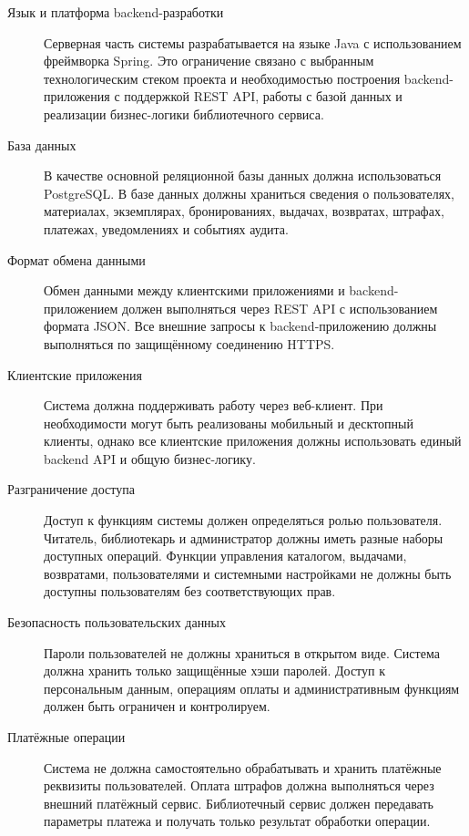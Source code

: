 \documentclass[12pt,a4paper]{article}
\begin{document}
	\begin{description}
		\item[Язык и платформа backend-разработки]
		Серверная часть системы разрабатывается на языке Java с использованием фреймворка Spring. Это ограничение связано с выбранным технологическим стеком
		проекта и необходимостью построения backend-приложения с поддержкой REST API,
		работы с базой данных и реализации бизнес-логики библиотечного сервиса.
		
		\item[База данных]
		В качестве основной реляционной базы данных должна использоваться PostgreSQL.
		В базе данных должны храниться сведения о пользователях, материалах,
		экземплярах, бронированиях, выдачах, возвратах, штрафах, платежах,
		уведомлениях и событиях аудита.
		
		\item[Формат обмена данными]
		Обмен данными между клиентскими приложениями и backend-приложением должен
		выполняться через REST API с использованием формата JSON. Все внешние запросы
		к backend-приложению должны выполняться по защищённому соединению HTTPS.
		
		\item[Клиентские приложения]
		Система должна поддерживать работу через веб-клиент. При необходимости могут
		быть реализованы мобильный и десктопный клиенты, однако все клиентские
		приложения должны использовать единый backend API и общую бизнес-логику.
		
		\item[Разграничение доступа]
		Доступ к функциям системы должен определяться ролью пользователя. Читатель,
		библиотекарь и администратор должны иметь разные наборы доступных операций.
		Функции управления каталогом, выдачами, возвратами, пользователями и
		системными настройками не должны быть доступны пользователям без
		соответствующих прав.
		
		\item[Безопасность пользовательских данных]
		Пароли пользователей не должны храниться в открытом виде. Система должна
		хранить только защищённые хэши паролей. Доступ к персональным данным,
		операциям оплаты и административным функциям должен быть ограничен и
		контролируем.
		
		\item[Платёжные операции]
		Система не должна самостоятельно обрабатывать и хранить платёжные реквизиты
		пользователей. Оплата штрафов должна выполняться через внешний платёжный
		сервис. Библиотечный сервис должен передавать параметры платежа и получать только
		результат обработки операции.
		

\end{description}
\end{document}

